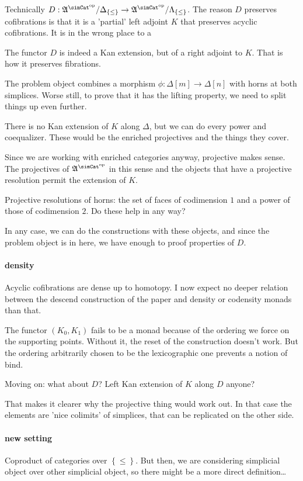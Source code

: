 \documentclass{tac}
\newcommand\set[1]{\left\{#1\right\}}
\newcommand\dual{^{\mathrm{op}}}
\newcommand\s{^{\simCat\dual}}
\newcommand\of{:}
\newcommand\simplex\Delta
\newcommand\horn\Lambda
\newcommand\ambient{\mathfrak A}
\begin{document}
Technically $D\of \ambient\s/\simplex_{\set\leq} \to \ambient\s/\horn_{\set\leq}$.
The reason $D$ preserves cofibrations is that it is a 'partial' left adjoint $K$ that preserves acyclic cofibrations. It is in the wrong place to a 

The functor $D$ is indeed a Kan extension, but of a right adjoint to $K$.
That is how it preserves fibrations.

The problem object combines a morphism $\phi\of\simplex[m]\to\simplex[n]$ with horns at both simplices. Worse still, to prove that it has the lifting property, we need to split things up even further.

There is no Kan extension of $K$ along $\Delta$, but we can do every power and coequalizer.
These would be the enriched projectives and the things they cover.

Since we are working with enriched categories anyway, projective makes sense. The projectives of $\ambient\s$ in this sense and the objects that have a projective resolution permit the extension of $K$.

Projective resolutions of horns: the set of faces of codimension $1$ and a power of those of codimension $2$. Do these help in any way?

In any case, we can do the constructions with these objects,
and since the problem object is in here, we have enough to proof properties of $D$.

\paragraph{density}
Acyclic cofibrations are dense up to homotopy. I now expect no deeper relation between the descend construction of the paper and density or codensity monads than that.

The functor $(K_0,K_1)$ fails to be a monad because of the ordering we force on the supporting points. Without it, the reset of the construction doesn't work. But the ordering arbitrarily chosen to be the lexicographic one prevents a notion of bind.

Moving on: what about $D$? Left Kan extension of $K$ along $D$ anyone?

That makes it clearer why the projective thing would work out.
In that case the elements are 'nice colimits' of simplices, 
that can be replicated on the other side.

\paragraph{new setting}
Coproduct of categories over $\set\leq$. But then, we are considering simplicial object over other simplicial object, so there might be a more direct definition\dots
\end{document}
